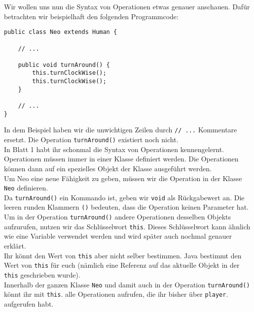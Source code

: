 \begin{Infobox}
    Wir wollen uns nun die Syntax von Operationen etwas genauer anschauen. 
    Dafür betrachten wir beispielhaft den folgenden Programmcode:

    \begin{lstlisting}[numbers=none]
public class Neo extends Human {

    // ...

    public void turnAround() {
        this.turnClockWise();
        this.turnClockWise();
    }

    // ...
}
    \end{lstlisting}

    In dem Beispiel haben wir die unwichtigen Zeilen durch \lstinline{// ...} Kommentare ersetzt.
    Die Operation \lstinline{turnAround()} existiert noch nicht.\\

    In Blatt 1 habt ihr schonmal die Syntax von Operationen kennengelernt.
    Operationen müssen immer in einer Klasse definiert werden.
    Die Operationen können dann auf ein spezielles Objekt der Klasse ausgeführt werden.\\

    Um Neo eine neue Fähigkeit zu geben, müssen wir die Operation in der Klasse \lstinline{Neo} definieren.\\

    Da \lstinline{turnAround()} ein Kommando ist, geben wir \lstinline{void} als Rückgabewert an.
    Die leeren runden Klammern \lstinline{()} bedeuten, dass die Operation keinen Parameter hat.\\

    Um in der Operation \lstinline{turnAround()} andere Operationen desselben Objekts aufzurufen, nutzen wir das Schlüsselwort \lstinline{this}.
    Dieses Schlüsselwort kann ähnlich wie eine Variable verwendet werden und wird später auch nochmal genauer erklärt.\\

    Ihr könnt den Wert von \lstinline{this} aber nicht selber bestimmen.
    Java bestimmt den Wert von \lstinline{this} für euch (nämlich eine Referenz auf das aktuelle Objekt in der \lstinline{this} geschrieben wurde).\\

    Innerhalb der ganzen Klasse \lstinline{Neo} und damit auch in der Operation \lstinline{turnAround()} könnt ihr mit \lstinline{this}. alle Operationen aufrufen, die ihr bisher über \lstinline{player}. aufgerufen habt.

\end{Infobox}


